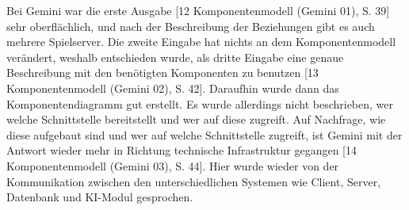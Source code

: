 Bei Gemini war die erste Ausgabe [12 Komponentenmodell (Gemini 01), S. 39] sehr oberflächlich, und nach der Beschreibung der Beziehungen gibt es auch mehrere Spielserver. Die 
zweite Eingabe hat nichts an dem Komponentenmodell verändert, weshalb entschieden wurde, als dritte Eingabe eine genaue Beschreibung 
mit den benötigten Komponenten zu benutzen [13 Komponentenmodell (Gemini 02), S. 42]. Daraufhin wurde dann das Komponentendiagramm gut erstellt. Es wurde allerdings nicht 
beschrieben, wer welche Schnittstelle bereitstellt und wer auf diese zugreift. Auf Nachfrage, wie diese aufgebaut sind und wer auf 
welche Schnittstelle zugreift, ist Gemini mit der Antwort wieder mehr in Richtung technische Infrastruktur gegangen [14 Komponentenmodell (Gemini 03), S. 44]. Hier wurde 
wieder von der Kommunikation zwischen den unterschiedlichen Systemen wie Client, Server, Datenbank und KI-Modul gesprochen.

